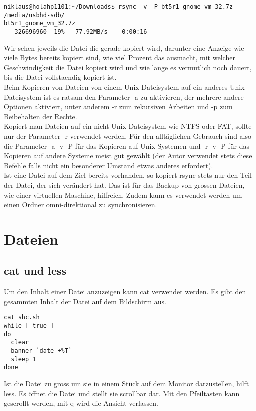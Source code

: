 \documentclass[10pt,paper=a4,final]{scrartcl}
\begin{document}
\begin{lstlisting}[frame=single]
niklaus@holahp1101:~/Downloads$ rsync -v -P bt5r1_gnome_vm_32.7z /media/usbhd-sdb/
bt5r1_gnome_vm_32.7z
   326696960  19%   77.92MB/s    0:00:16
\end{lstlisting}
Wir sehen jeweils die Datei die gerade kopiert wird, darunter eine Anzeige wie viele Bytes bereits kopiert sind, wie viel Prozent das ausmacht, mit welcher Geschwindigkeit die Datei kopiert wird und wie lange es vermutlich noch dauert, bis die Datei vollstaendig kopiert ist.\\
Beim Kopieren von Dateien von einem Unix Dateisystem auf ein anderes Unix Dateisystem ist es ratsam den Parameter -a zu aktivieren, der mehrere andere Optionen aktiviert, unter anderem -r zum rekursiven Arbeiten und -p zum Beibehalten der Rechte.\\
Kopiert man Dateien auf ein nicht Unix Dateisystem wie NTFS oder FAT, sollte nur der Parameter -r verwendet werden. F\"ur den allt\"aglichen Gebrauch sind also die Parameter -a -v -P f\"ur das Kopieren auf Unix Systemen und -r -v -P f\"ur das Kopieren auf andere Systeme meist gut gew\"ahlt (der Autor verwendet stets diese Befehle falls nicht ein besonderer Umstand etwas anderes erfordert).\\
Ist eine Datei auf dem Ziel bereits vorhanden, so kopiert rsync stets nur den Teil der Datei, der sich ver\"andert hat. Das ist f\"ur das Backup von grossen Dateien, wie einer virtuellen Maschine, hilfreich. Zudem kann es verwendet werden um einen Ordner omni-direktional zu synchronisieren.



\section{Dateien}
\subsection{cat und less}
Um den Inhalt einer Datei anzuzeigen kann cat verwendet werden. Es gibt den gesammten Inhalt der Datei auf dem Bildschirm aus.
\begin{lstlisting}[frame=single]
cat shc.sh
while [ true ]
do
  clear
  banner `date +%T`
  sleep 1
done
\end{lstlisting}
Ist die Datei zu gross um sie in einem St\"uck auf dem Monitor darzustellen, hilft less. Es \"offnet die Datei und stellt sie scrollbar dar. Mit den Pfeiltasten kann gescrollt werden, mit q wird die Ansicht verlassen.
\end{document}
